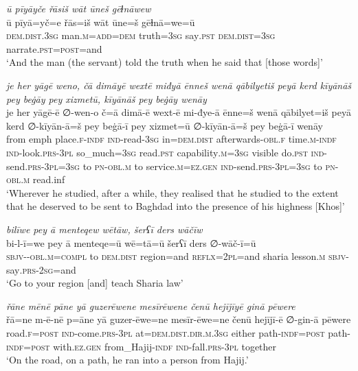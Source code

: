 \ea \label{ŽP.77}
\textit{ū pīyāyče řāsiš wāt ūneš gēɫnāwew} \\ 
\gll ū pīyā=yč=e řās=iš wāt ūne=š gēɫnā=we=ū \\ 
 \textsc{dem.dist}\textsc{.3sg} man\textsc{.m}\textsc{=add}\textsc{=dem} truth\textsc{=3sg} say\textsc{.pst} \textsc{dem.dist}\textsc{=3sg} narrate\textsc{.pst}\textsc{=\textsc{post}}=and \\ 
\glt `And the man (the servant) told the truth when he said that [those words]'
\z 
 
\ea \label{ŽP.80}
\textit{je her yāgē weno, čā dimāyē wextē miđyā ēnneš wenā qābilyetiš peyā kerd kīyānāš pey beġāy pey xizmetū, kīyānāš pey beġāy wenāy} \\ 
\gll je her yāgē-ē ∅-wen-o č=ā dimā-ē wext-ē mi-đye-ā ēnne=š wenā qābilyet=iš peyā kerd ∅-kīyān-ā=š pey beġā-ī pey xizmet=ū ∅-kīyān-ā=š pey beġā-ī wenāy \\ 
 from emph place\textsc{.f}\textsc{-indf} \textsc{ind-}read\textsc{-3sg} in=\textsc{dem.dist} afterwards\textsc{-obl}\textsc{.f} time\textsc{.m}\textsc{-indf} \textsc{ind-}look\textsc{.prs}\textsc{-3pl} so\_much\textsc{=3sg} read\textsc{.pst} capability\textsc{.m}\textsc{=3sg} visible do\textsc{.pst} \textsc{ind-}send\textsc{.prs}\textsc{-3pl}\textsc{=3sg} to \textsc{pn}\textsc{-obl}\textsc{.m} to service\textsc{.m}\textsc{\textsc{=ez.gen}} \textsc{ind-}send\textsc{.prs}\textsc{-3pl}\textsc{=3sg} to \textsc{pn}\textsc{-obl}\textsc{.m} read.inf \\ 
\glt `Wherever he studied, after a while, they realised that he studied to the extent that he deserved to be sent to Baghdad into the presence of his highness [Khos]'
\z 
 
\ea \label{ŽP.93}
\textit{bilīwe pey ā menteqew wētāw, šerʕī ders wāčīw} \\ 
\gll bi-l-ī=we pey ā menteqe=ū wē=tā=ū šerʕī ders ∅-wāč-ī=ū \\ 
 \textsc{sbjv-}\textsc{-obl}\textsc{.m}\textsc{=compl} to \textsc{dem.dist} region=and \textsc{reflx}=\textsc{2pl}=and sharia lesson\textsc{.m} \textsc{sbjv-}say\textsc{.prs-}\textsc{2sg}=and \\ 
\glt `Go to your region [and] teach Sharia law'
\z 
 
\ea \label{ŽP.97}
\textit{řāne mēnē pāne yā guzerēwene mesīrēwene čenū hejījīyē ginā pēwere} \\ 
\gll řā=ne m-ē-nē p=āne yā guzer-ēwe=ne mesīr-ēwe=ne čenū hejījī-ē ∅-gin-ā pēwere \\ 
 road\textsc{.f}\textsc{=\textsc{post}} \textsc{ind-}come\textsc{.prs}\textsc{-3pl} at=\textsc{dem.dist}\textsc{.dir}\textsc{.m}\textsc{.3sg} either path\textsc{-indf}\textsc{=\textsc{post}} path\textsc{-indf}\textsc{=\textsc{post}} with\textsc{.ez.gen} from\_Hajij\textsc{-indf} \textsc{ind-}fall\textsc{.prs}\textsc{-3pl} together \\ 
\glt `On the road, on a path, he ran into a person from Hajij.'
\z 
 
